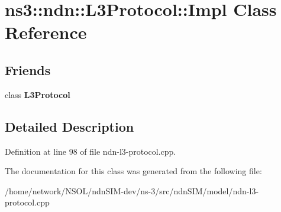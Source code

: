 \hypertarget{classns3_1_1ndn_1_1L3Protocol_1_1Impl}{}\section{ns3\+:\+:ndn\+:\+:L3\+Protocol\+:\+:Impl Class Reference}
\label{classns3_1_1ndn_1_1L3Protocol_1_1Impl}
\subsection*{Friends}
\begin{DoxyCompactItemize}
\item 
class {\bfseries L3\+Protocol}\hypertarget{classns3_1_1ndn_1_1L3Protocol_1_1Impl_a15b10cfbbc165fba41adb300cbb31be7}{}\label{classns3_1_1ndn_1_1L3Protocol_1_1Impl_a15b10cfbbc165fba41adb300cbb31be7}

\end{DoxyCompactItemize}


\subsection{Detailed Description}


Definition at line 98 of file ndn-\/l3-\/protocol.\+cpp.



The documentation for this class was generated from the following file\+:\begin{DoxyCompactItemize}
\item 
/home/network/\+N\+S\+O\+L/ndn\+S\+I\+M-\/dev/ns-\/3/src/ndn\+S\+I\+M/model/ndn-\/l3-\/protocol.\+cpp\end{DoxyCompactItemize}

